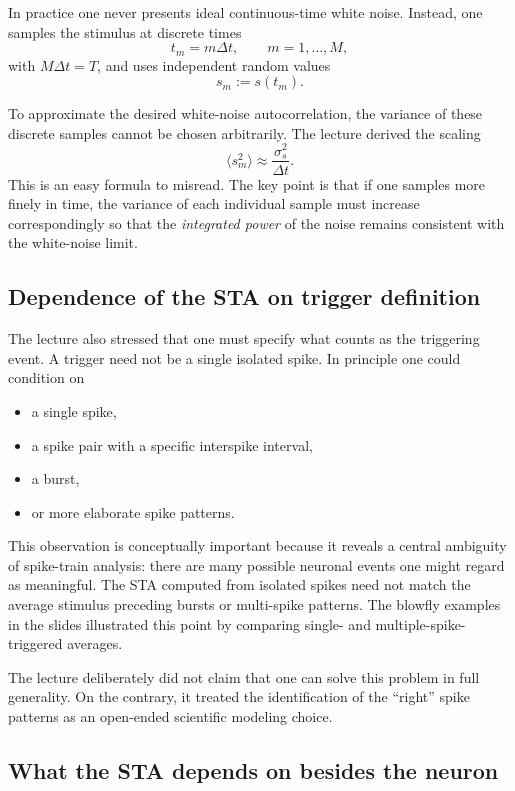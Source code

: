 \documentclass[11pt]{article}
\begin{document}
In practice one never presents ideal continuous-time white noise. Instead, one samples the stimulus at discrete times
\[
t_m = m\Delta t, \qquad m=1,\dots,M,
\]
with $M\Delta t = T$, and uses independent random values
\[
s_m := s(t_m).
\]

To approximate the desired white-noise autocorrelation, the variance of these discrete samples cannot be chosen arbitrarily. The lecture derived the scaling
\[
\langle s_m^2 \rangle \approx \frac{\sigma_s^2}{\Delta t}.
\]
This is an easy formula to misread. The key point is that if one samples more finely in time, the variance of each individual sample must increase correspondingly so that the \emph{integrated power} of the noise remains consistent with the white-noise limit.

\subsection{Dependence of the STA on trigger definition}

The lecture also stressed that one must specify what counts as the triggering event. A trigger need not be a single isolated spike. In principle one could condition on
\begin{itemize}
    \item a single spike,
    \item a spike pair with a specific interspike interval,
    \item a burst,
    \item or more elaborate spike patterns.
\end{itemize}

This observation is conceptually important because it reveals a central ambiguity of spike-train analysis: there are many possible neuronal events one might regard as meaningful. The STA computed from isolated spikes need not match the average stimulus preceding bursts or multi-spike patterns. The blowfly examples in the slides illustrated this point by comparing single- and multiple-spike-triggered averages.

The lecture deliberately did not claim that one can solve this problem in full generality. On the contrary, it treated the identification of the ``right'' spike patterns as an open-ended scientific modeling choice.

\subsection{What the STA depends on besides the neuron}
\end{document}
